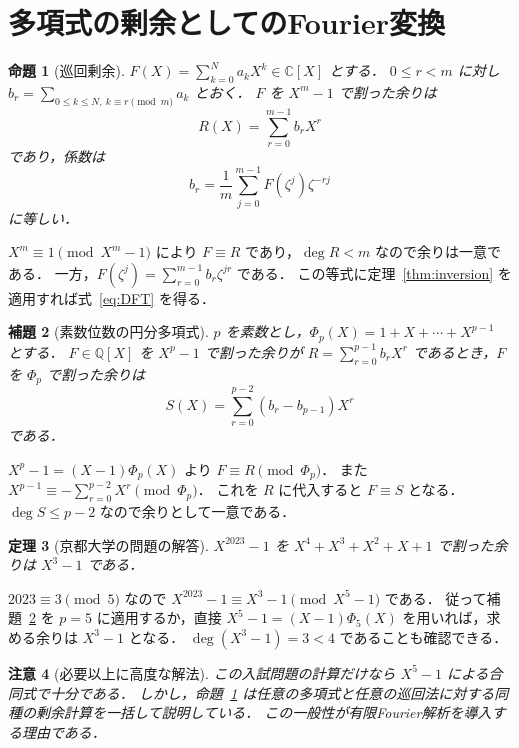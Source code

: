 \documentclass[a5paper,10pt,onecolumn]{jsarticle}
\makeatletter
\theoremstyle{mathnotetheorem}
\newtheorem{theorem}{定理}[section]
\newtheorem{lemma}[theorem]{補題}
\newtheorem{proposition}[theorem]{命題}
\newtheorem{remark}[theorem]{注意}
\renewcommand{\proofname}{証明}
\renewenvironment{proof}[1][\proofname]{%
  \par\pushQED{\qed}\normalfont\topsep4\p@\@plus2\p@\relax
  \trivlist\item[\hskip\labelsep\bfseries #1]\ignorespaces
}{\popQED\endtrivlist\@endpefalse}
\makeatother
\begin{document}
\section{多項式の剰余としてのFourier変換}
\begin{proposition}[巡回剰余]\label{prop:cyclic}
$F(X)=\sum_{k=0}^{N}a_kX^k\in\mathbb C[X]$ とする．
$0\le r<m$ に対し $b_r=\sum_{0\le k\le N,\ k\equiv r\pmod m}a_k$ とおく．
$F$ を $X^m-1$ で割った余りは
\[
 R(X)=\sum_{r=0}^{m-1}b_rX^r
\]
であり，係数は
\begin{equation}\label{eq:DFT}
 b_r=\frac1m\sum_{j=0}^{m-1}F(\zeta^j)\zeta^{-rj}
\end{equation}
に等しい．
\end{proposition}
\begin{proof}
$X^m\equiv1\pmod{X^m-1}$ により $F\equiv R$ であり，$\deg R<m$ なので余りは一意である．
一方，$F(\zeta^j)=\sum_{r=0}^{m-1}b_r\zeta^{jr}$ である．
この等式に定理~\ref{thm:inversion} を適用すれば式~\eqref{eq:DFT} を得る．
\end{proof}

\begin{lemma}[素数位数の円分多項式]\label{lem:cyclo}
$p$ を素数とし，$\Phi_p(X)=1+X+\cdots+X^{p-1}$ とする．
$F\in\mathbb Q[X]$ を $X^p-1$ で割った余りが $R=\sum_{r=0}^{p-1}b_rX^r$ であるとき，$F$ を $\Phi_p$ で割った余りは
\[
 S(X)=\sum_{r=0}^{p-2}(b_r-b_{p-1})X^r
\]
である．
\end{lemma}
\begin{proof}
$X^p-1=(X-1)\Phi_p(X)$ より $F\equiv R\pmod{\Phi_p}$．
また $X^{p-1}\equiv-\sum_{r=0}^{p-2}X^r\pmod{\Phi_p}$．
これを $R$ に代入すると $F\equiv S$ となる．$\deg S\le p-2$ なので余りとして一意である．
\end{proof}

\begin{theorem}[京都大学の問題の解答]\label{thm:kyoto}
$X^{2023}-1$ を $X^4+X^3+X^2+X+1$ で割った余りは $X^3-1$ である．
\end{theorem}
\begin{proof}
$2023\equiv3\pmod5$ なので $X^{2023}-1\equiv X^3-1\pmod{X^5-1}$ である．
従って補題~\ref{lem:cyclo} を $p=5$ に適用するか，直接 $X^5-1=(X-1)\Phi_5(X)$ を用いれば，求める余りは $X^3-1$ となる．
$\deg(X^3-1)=3<4$ であることも確認できる．
\end{proof}

\begin{remark}[必要以上に高度な解法]
この入試問題の計算だけなら $X^5-1$ による合同式で十分である．
しかし，命題~\ref{prop:cyclic} は任意の多項式と任意の巡回法に対する同種の剰余計算を一括して説明している．
この一般性が有限Fourier解析を導入する理由である．
\end{remark}
\end{document}
